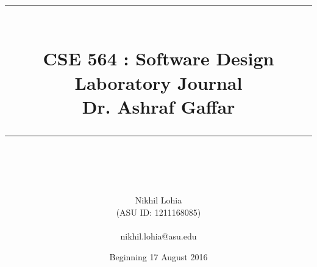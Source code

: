 \documentclass[index=totoc,hyperref,openany]{labbook} %
\newcommand{\HRule}{\rule{\linewidth}{0.5mm}} %
\begin{document}

\frontmatter %
\title{
\begin{center}
\HRule \\[0.4cm]
{\Huge \bfseries CSE 564 : Software Design \\Laboratory Journal \\[0.5cm] \Large Dr. Ashraf Gaffar}\\[0.4cm] %
\HRule \\[1.5cm]
\end{center}
}
\author{\Huge Nikhil Lohia \\ (ASU ID: 1211168085) \\ \\ \LARGE nikhil.lohia@asu.edu \\[2cm]} %
\date{Beginning 17 August 2016} %
\maketitle

\tableofcontents

\mainmatter %









\end{document}
